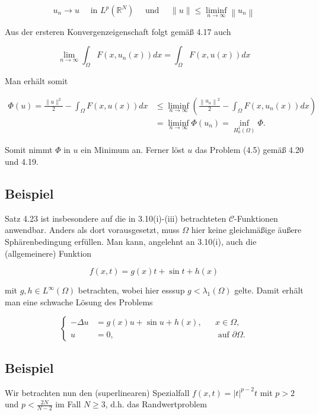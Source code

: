 \documentclass[10pt, letterpaper]{article}
\begin{document}
$$
u_{n} \rightarrow u \quad \text { in } L^{p}\left(\mathbb{R}^{N}\right) \quad \text { und } \quad\|u\| \leq \liminf _{n \rightarrow \infty}\left\|u_{n}\right\|
$$

Aus der ersteren Konvergenzeigenschaft folgt gemäß 4.17 auch

$$
\lim _{n \rightarrow \infty} \int_{\Omega} F\left(x, u_{n}(x)\right) d x=\int_{\Omega} F(x, u(x)) d x
$$

Man erhält somit

$$
\begin{aligned}
\Phi(u)=\frac{\|u\|^{2}}{2}-\int_{\Omega} F(x, u(x)) d x & \leq \liminf _{n \rightarrow \infty}\left(\frac{\left\|u_{n}\right\|^{2}}{2}-\int_{\Omega} F\left(x, u_{n}(x)\right) d x\right) \\
& =\liminf _{n \rightarrow \infty} \Phi\left(u_{n}\right)=\inf _{H_{0}^{1}(\Omega)} \Phi .
\end{aligned}
$$

Somit nimmt $\Phi$ in $u$ ein Minimum an. Ferner löst $u$ das Problem (4.5) gemäß 4.20 und 4.19.

\subsection*{Beispiel}

Satz 4.23 ist insbesondere auf die in 3.10(i)-(iii) betrachteten $\mathcal{C}$-Funktionen anwendbar. Anders als dort vorausgesetzt, muss $\Omega$ hier keine gleichmäßige äußere Sphärenbedingung erfüllen. Man kann, angelehnt an 3.10(i), auch die (allgemeinere) Funktion

$$
f(x, t)=g(x) t+\sin t+h(x)
$$

mit $g, h \in L^{\infty}(\Omega)$ betrachten, wobei hier esssup $g<\lambda_{1}(\Omega)$ gelte. Damit erhält man eine schwache Lösung des Problems

$$
\left\{\begin{aligned}
-\Delta u & =g(x) u+\sin u+h(x), & & x \in \Omega, \\
u & =0, & & \text { auf } \partial \Omega .
\end{aligned}\right.
$$

\subsection*{Beispiel}

Wir betrachten nun den (superlinearen) Spezialfall $f(x, t)=|t|^{p-2} t$ mit $p>2$ und $p<\frac{2 N}{N-2}$ im Fall $N \geq 3$, d.h. das Randwertproblem
\end{document}
